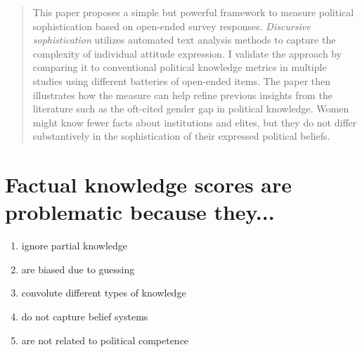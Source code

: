 \documentclass[a0,landscape]{a0poster}
\begin{document}

\begin{multicols}{4} %

\color{Navy} %
\begin{abstract}
This paper proposes a simple but powerful framework to measure political sophistication based on open-ended survey responses. \textit{Discursive sophistication} utilizes automated text analysis methods to capture the complexity of individual attitude expression. I validate the approach by comparing it to conventional political knowledge metrics in multiple studies using different batteries of open-ended items. The paper then illustrates how the measure can help refine previous insights from the literature such as the oft-cited gender gap in political knowledge. Women might know fewer facts about institutions and elites, but they do not differ substantively in the sophistication of their expressed political beliefs.
\end{abstract}

\color{SaddleBrown} %
\section*{Factual knowledge scores are problematic because they...}
\begin{enumerate}[...]
   \item ignore partial knowledge \citep[e.g.][]{debell2013harder}
   \item are biased due to guessing \citep[e.g.][]{mondak2004knowledge}
   \item convolute different types of knowledge \citep{barabas2014question}
   \item do not capture belief systems \citep{luskin1987measuring,tetlock1983cognitive}
   \item are not related to political competence \citep{lupia2006elitism}
\end{enumerate}


\color{Black} %

\end{multicols}
\end{document}
